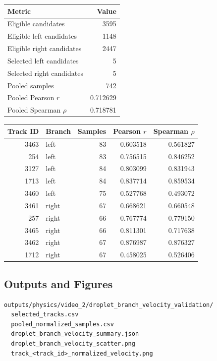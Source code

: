 \begin{center}
\begin{tabular}{@{}lr@{}}
\toprule
Metric & Value \\
\midrule
Eligible candidates & 3595 \\
Eligible left candidates & 1148 \\
Eligible right candidates & 2447 \\
Selected left candidates & 5 \\
Selected right candidates & 5 \\
Pooled samples & 742 \\
Pooled Pearson \(r\) & 0.712629 \\
Pooled Spearman \(\rho\) & 0.718781 \\
\bottomrule
\end{tabular}
\end{center}

\begin{center}
\begin{tabular}{@{}rlrrr@{}}
\toprule
Track ID & Branch & Samples & Pearson \(r\) & Spearman \(\rho\) \\
\midrule
3463 & left & 83 & 0.603518 & 0.561827 \\
254 & left & 83 & 0.756515 & 0.846252 \\
3127 & left & 84 & 0.803099 & 0.831943 \\
1713 & left & 84 & 0.837714 & 0.859534 \\
3460 & left & 75 & 0.527768 & 0.493072 \\
3461 & right & 67 & 0.668621 & 0.660548 \\
257 & right & 66 & 0.767774 & 0.779150 \\
3465 & right & 66 & 0.811301 & 0.717638 \\
3462 & right & 67 & 0.876987 & 0.876327 \\
1712 & right & 67 & 0.458025 & 0.526406 \\
\bottomrule
\end{tabular}
\end{center}

\subsection{Outputs and Figures}

\begin{verbatim}
outputs/physics/video_2/droplet_branch_velocity_validation/
  selected_tracks.csv
  pooled_normalized_samples.csv
  droplet_branch_velocity_summary.json
  droplet_branch_velocity_scatter.png
  track_<track_id>_normalized_velocity.png
\end{verbatim}

